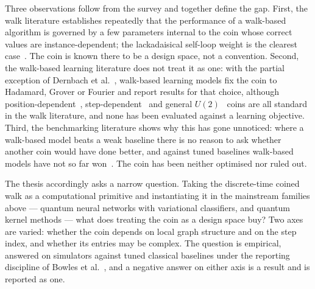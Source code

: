 Three observations follow from the survey and together define the gap. First,
the walk literature establishes repeatedly that the performance of a
walk-based algorithm is governed by a few parameters internal to the coin
whose correct values are instance-dependent; the lackadaisical self-loop
weight is the clearest case~\cite{Nahimovs_2018, Rhodes_2019, Rapoza_2021}.
The coin is known there to be a design space, not a convention. Second, the
walk-based learning literature does not treat it as one: with the partial
exception of Dernbach et al.~\cite{Dernbach_2019}, walk-based learning models
fix the coin to Hadamard, Grover or Fourier and report results for that
choice, although position-dependent~\cite{Ahmad_2020},
step-dependent~\cite{Panahiyan_2018} and general $U(2)$~\cite{Li_2012,
Souza_2013} coins are all standard in the walk literature, and none has been
evaluated against a learning objective. Third, the benchmarking literature
shows why this has gone unnoticed: where a walk-based model beats a weak
baseline there is no reason to ask whether another coin would have done
better, and against tuned baselines walk-based models have not so far
won~\cite{Bowles_2024}. The coin has been neither optimised nor ruled out.

The thesis accordingly asks a narrow question. Taking the discrete-time coined
walk as a computational primitive and instantiating it in the mainstream
families above --- quantum neural networks with variational classifiers, and
quantum kernel methods --- what does treating the coin as a design space buy?
Two axes are varied: whether the coin depends on local graph structure and on
the step index, and whether its entries may be complex. The question is
empirical, answered on simulators against tuned classical baselines under the
reporting discipline of Bowles et al.~\cite{Bowles_2024}, and a negative
answer on either axis is a result and is reported as one.

